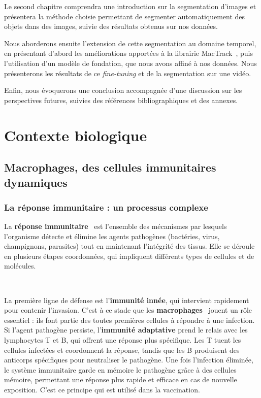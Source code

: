 \documentclass[a4paper,12pt]{report}
\begin{document}
Le second chapitre comprendra une introduction sur la segmentation d'images et présentera la méthode choisie permettant de segmenter automatiquement des objets dans des images, suivie des résultats obtenus sur nos données.

Nous aborderons ensuite l'extension de cette segmentation au domaine temporel, en présentant d'abord les améliorations apportées à la librairie MacTrack~\cite{axel}, puis l'utilisation d'un modèle de fondation, que nous avons affiné à nos données. Nous présenterons les résultats de ce \textit{fine-tuning} et de la segmentation sur une vidéo.

Enfin, nous évoquerons une conclusion accompagnée d'une discussion sur les perspectives futures, suivies des références bibliographiques et des annexes.

\cleardoublepage
\chapter{Contexte biologique}

\section{Macrophages, des cellules immunitaires dynamiques}

\subsection{La réponse immunitaire : un processus complexe}
La \textbf{réponse immunitaire}~\cite{sysimmun} est l'ensemble des mécanismes par lesquels l'organisme détecte et élimine les agents pathogènes (bactéries, virus, champignons, parasites) tout en maintenant l'intégrité des tissus. Elle se déroule en plusieurs étapes coordonnées, qui impliquent différents types de cellules et de molécules.

\

La première ligne de défense est l'\textbf{immunité innée}, qui intervient rapidement pour contenir l'invasion. C'est à ce stade que les \textbf{macrophages}~\cite{macro} jouent un rôle essentiel : ils font partie des toutes premières cellules à répondre à une infection. Si l'agent pathogène persiste, l'\textbf{immunité adaptative} prend le relais avec les lymphocytes T et B, qui offrent une réponse plus spécifique. Les T tuent les cellules infectées et coordonnent la réponse, tandis que les B produisent des anticorps spécifiques pour neutraliser le pathogène. Une fois l'infection éliminée, le système immunitaire garde en mémoire le pathogène grâce à des cellules mémoire, permettant une réponse plus rapide et efficace en cas de nouvelle exposition. C'est ce principe qui est utilisé dans la vaccination.
\end{document}
